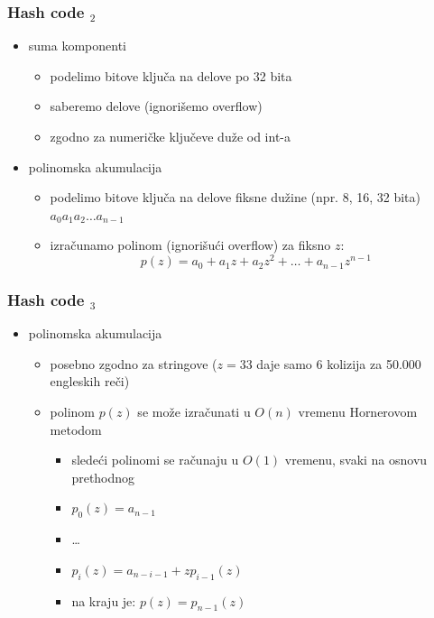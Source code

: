 \documentclass[compress]{beamer}
\begin{document}
\begin{frame}[fragile]
  \frametitle{Hash code $_2$}
  \begin{itemize}
    \item suma komponenti
    \begin{itemize}
      \item podelimo bitove ključa na delove po 32 bita
      \item saberemo delove (ignorišemo overflow)
      \item zgodno za numeričke ključeve duže od int-a
    \end{itemize}
    \item polinomska akumulacija
    \begin{itemize}
      \item podelimo bitove ključa na delove fiksne dužine (npr. 8, 16, 32 bita) $a_0 a_1 a_2 \ldots a_{n-1}$
      \item izračunamo polinom (ignorišući overflow) za fiksno $z$:
      $$ p(z) = a_0 + a_1 z + a_2 z^2 + \ldots + a_{n-1} z^{n-1}$$
    \end{itemize}
  \end{itemize}
\end{frame}

\begin{frame}[fragile]
  \frametitle{Hash code $_3$}
  \begin{itemize}
    \item polinomska akumulacija
    \begin{itemize}
      \item posebno zgodno za stringove ($z=33$ daje samo 6 kolizija za 50.000 engleskih reči)
      \item polinom $p(z)$ se može izračunati u $O(n)$ vremenu Hornerovom metodom
      \begin{itemize}
        \item sledeći polinomi se računaju u $O(1)$ vremenu, svaki na osnovu prethodnog
        \item $p_0(z) = a_{n-1}$
        \item \ldots
        \item $p_i(z) = a_{n-i-1} + zp_{i-1}(z)$
        \item na kraju je: $p(z) = p_{n-1}(z)$
      \end{itemize}
    \end{itemize}
  \end{itemize}
\end{frame}
\end{document}
